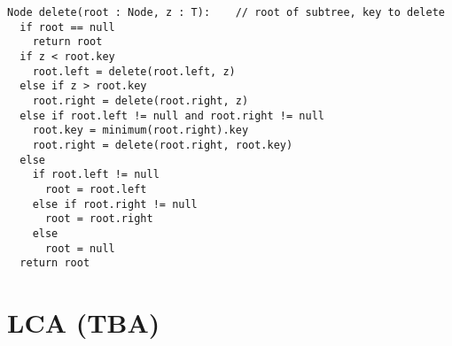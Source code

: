 \documentclass[a4paper]{article}
\begin{document}
\begin{lstlisting}
Node delete(root : Node, z : T):    // root of subtree, key to delete
  if root == null
    return root
  if z < root.key
    root.left = delete(root.left, z)
  else if z > root.key
    root.right = delete(root.right, z)
  else if root.left != null and root.right != null
    root.key = minimum(root.right).key
    root.right = delete(root.right, root.key)
  else
    if root.left != null
      root = root.left
    else if root.right != null
      root = root.right
    else
      root = null
  return root
\end{lstlisting}

\newpage
\section{LCA (TBA)}
\end{document}
